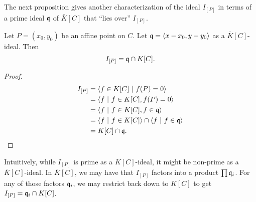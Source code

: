 The next proposition gives another characterization of the ideal $I_{[P]}$
in terms of a prime ideal $\frak q$ of $\bar K[C]$ that ``lies over'' $I_{[P]}$.
\begin{proposition}
  Let $P = (x_0, y_0)$ be an affine point on $C$.
  Let $\frak q = \left\langle x - x_0, y - y_0 \right\rangle$ as a $\bar K[C]$-ideal. Then
  \[ I_{[P]} = \frak q \cap K[C]. \]
\end{proposition}
\begin{proof}
  \begin{align*}
    I_{[P]}
      &= \left\langle  f \in K[C] ~|~ f(P) = 0  \right\rangle \\
      &= \left\langle  f ~|~ f \in K[C], f(P) = 0  \right\rangle \\
      &= \left\langle  f ~|~ f \in K[C], f \in \frak q  \right\rangle \\
      &= \left\langle  f ~|~ f \in K[C] \right\rangle \cap \left\langle  f ~|~ f \in \frak q  \right\rangle \\
      &= K[C] \cap \frak q.
  \end{align*}
\end{proof}
Intuitively, while $I_{[P]}$ is prime as a $K[C]$-ideal, it might be non-prime as a $\bar K[C]$-ideal.
In $\bar K[C]$, we may have that $I_{[P]}$ factors into a product $\prod \frak q_i$.
For any of those factors $\frak q_i$, we may restrict back down to $K[C]$ to get $I_{[P]} = \frak q_i \cap K[C]$. 

